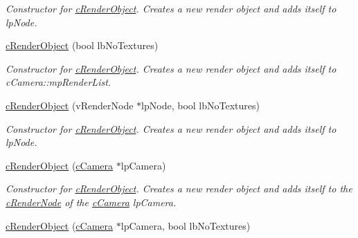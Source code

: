 \begin{DoxyCompactItemize}
\begin{DoxyCompactList}\small\item\em Constructor for \hyperlink{classc_render_object}{cRenderObject}. Creates a new render object and adds itself to lpNode. \end{DoxyCompactList}\item 
\hypertarget{classc_render_object_a5721ec744bfaf97aed8f5ec9e212aa39}{
\hyperlink{classc_render_object_a5721ec744bfaf97aed8f5ec9e212aa39}{cRenderObject} (bool lbNoTextures)}
\label{classc_render_object_a5721ec744bfaf97aed8f5ec9e212aa39}

\begin{DoxyCompactList}\small\item\em Constructor for \hyperlink{classc_render_object}{cRenderObject}. Creates a new render object and adds itself to cCamera::mpRenderList. \end{DoxyCompactList}\item 
\hypertarget{classc_render_object_a9a0f0cb2996914f11569fbf215ab7306}{
\hyperlink{classc_render_object_a9a0f0cb2996914f11569fbf215ab7306}{cRenderObject} (vRenderNode $\ast$lpNode, bool lbNoTextures)}
\label{classc_render_object_a9a0f0cb2996914f11569fbf215ab7306}

\begin{DoxyCompactList}\small\item\em Constructor for \hyperlink{classc_render_object}{cRenderObject}. Creates a new render object and adds itself to lpNode. \end{DoxyCompactList}\item 
\hypertarget{classc_render_object_a22971185fccf5b0ea77761eca31fc1eb}{
\hyperlink{classc_render_object_a22971185fccf5b0ea77761eca31fc1eb}{cRenderObject} (\hyperlink{classc_camera}{cCamera} $\ast$lpCamera)}
\label{classc_render_object_a22971185fccf5b0ea77761eca31fc1eb}

\begin{DoxyCompactList}\small\item\em Constructor for \hyperlink{classc_render_object}{cRenderObject}. Creates a new render object and adds itself to the \hyperlink{classc_render_node}{cRenderNode} of the \hyperlink{classc_camera}{cCamera} lpCamera. \end{DoxyCompactList}\item 
\hypertarget{classc_render_object_a1a654b5029882db9175593b1f717c798}{
\hyperlink{classc_render_object_a1a654b5029882db9175593b1f717c798}{cRenderObject} (\hyperlink{classc_camera}{cCamera} $\ast$lpCamera, bool lbNoTextures)}
\label{classc_render_object_a1a654b5029882db9175593b1f717c798}


\end{DoxyCompactItemize}
